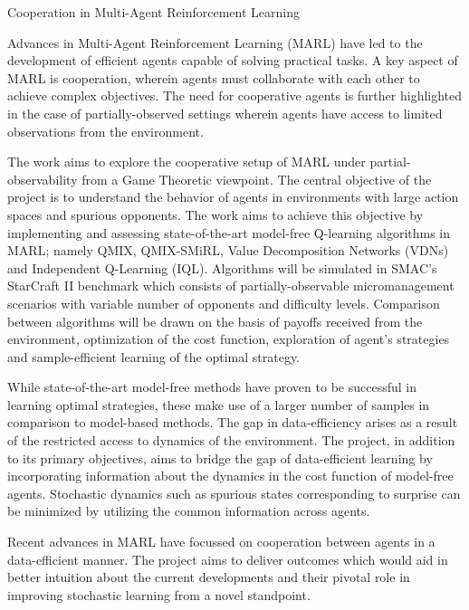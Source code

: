 \documentclass[10pt,letterpaper]{article}
\begin{document}
\begin{center}
  \large{Cooperation in Multi-Agent Reinforcement Learning}
\end{center}

Advances in Multi-Agent Reinforcement Learning (MARL) have led to the development of efficient agents capable of solving practical tasks. A key aspect of MARL is cooperation, wherein agents must collaborate with each other to achieve complex objectives. The need for cooperative agents is further highlighted in the case of partially-observed settings wherein agents have access to limited observations from the environment.

The work aims to explore the cooperative setup of MARL under partial-observability from a Game Theoretic viewpoint. The central objective of the project is to understand the behavior of agents in environments with large action spaces and spurious opponents. The work aims to achieve this objective by implementing and assessing state-of-the-art model-free Q-learning algorithms in MARL; namely QMIX, QMIX-SMiRL, Value Decomposition Networks (VDNs) and Independent Q-Learning (IQL). Algorithms will be simulated in SMAC's StarCraft II benchmark which consists of partially-observable micromanagement scenarios with variable number of opponents and difficulty levels. Comparison between algorithms will be drawn on the basis of payoffs received from the environment, optimization of the cost function, exploration of agent's strategies and sample-efficient learning of the optimal strategy.

While state-of-the-art model-free methods have proven to be successful in learning optimal strategies, these make use of a larger number of samples in comparison to model-based methods. The gap in data-efficiency arises as a result of the restricted access to dynamics of the environment. The project, in addition to its primary objectives, aims to bridge the gap of data-efficient learning by incorporating information about the dynamics in the cost function of model-free agents. Stochastic dynamics such as spurious states corresponding to surprise can be minimized by utilizing the common information across agents. 

Recent advances in MARL have focussed on cooperation between agents in a data-efficient manner. The project aims to deliver outcomes which would aid in better intuition about the current developments and their pivotal role in improving stochastic learning from a novel standpoint. 


\small{}
\end{document}
